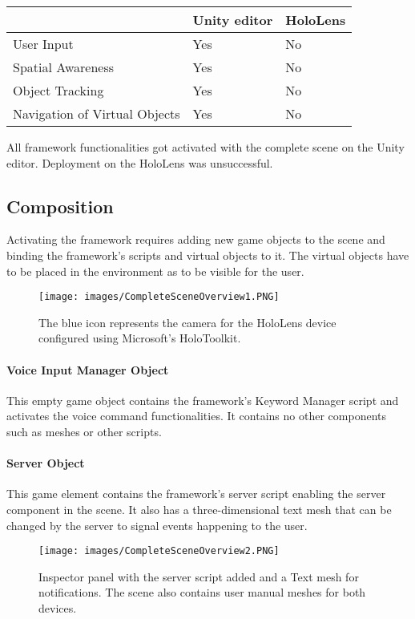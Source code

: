 \begin{center}
\begin{tabularx}{\textwidth} {|X|X|X|}
	\hline
	 & Unity editor & HoloLens \\
	\hline
	User Input &  Yes & No \\
	\hline
	Spatial Awareness & Yes & No \\
	\hline
	Object Tracking & Yes & No \\
	\hline
	Navigation of Virtual Objects & Yes & No \\
	\hline
\end{tabularx}	
\caption{All framework functionalities got activated with the complete scene on the Unity editor. Deployment on the HoloLens was unsuccessful. }
\end{center}


\subsection{Composition}
Activating the framework requires adding new game objects to the scene and binding the framework's scripts and virtual objects to it. The virtual objects have to be placed in the environment as to be visible for the user.

\begin{figure}[!htb]
	\texttt{[image: images/CompleteSceneOverview1.PNG]}
	\captionsetup{width=1.0\textwidth}
	\centering
	\caption{The blue icon represents the camera for the HoloLens device configured using Microsoft's HoloToolkit.}
\end{figure}

\paragraph{Voice Input Manager Object}
This empty game object contains the framework's Keyword Manager script and activates the voice command functionalities. It contains no other components such as meshes or other scripts.

\paragraph{Server Object}
This game element contains the framework's server script enabling the server component in the scene. It also has a three-dimensional text mesh that can be changed by the server to signal events happening to the user.

\begin{figure}[!htb]
	\texttt{[image: images/CompleteSceneOverview2.PNG]}
	\captionsetup{width=1.0\textwidth}
	\centering
	\caption{Inspector panel with the server script added and a Text mesh for notifications. The scene also contains user manual meshes for both devices.}
\end{figure}


